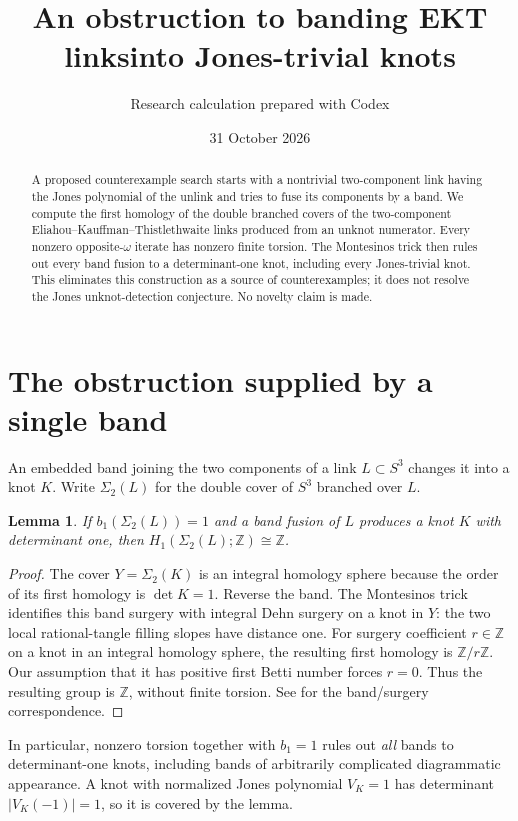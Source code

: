 \documentclass[11pt]{article}
\title{An obstruction to banding EKT links\newline into Jones-trivial knots}
\author{Research calculation prepared with Codex}
\date{31 October 2026}
\newtheorem{lemma}{Lemma}
\newcommand{\Z}{\mathbb Z}
\newcommand{\Sig}{\Sigma_2}
\begin{document}
\maketitle
\begin{abstract}
A proposed counterexample search starts with a nontrivial two-component link having the Jones polynomial of the unlink and tries to fuse its components by a band. We compute the first homology of the double branched covers of the two-component Eliahou--Kauffman--Thistlethwaite links produced from an unknot numerator. Every nonzero opposite-$\omega$ iterate has nonzero finite torsion. The Montesinos trick then rules out every band fusion to a determinant-one knot, including every Jones-trivial knot. This eliminates this construction as a source of counterexamples; it does not resolve the Jones unknot-detection conjecture. No novelty claim is made.
\end{abstract}

\section{The obstruction supplied by a single band}
An embedded band joining the two components of a link $L\subset S^3$ changes it into a knot $K$. Write $\Sig(L)$ for the double cover of $S^3$ branched over $L$.
\begin{lemma}\label{band}
If $b_1(\Sig(L))=1$ and a band fusion of $L$ produces a knot $K$ with determinant one, then $H_1(\Sig(L);\Z)\cong\Z$.
\end{lemma}
\begin{proof}
The cover $Y=\Sig(K)$ is an integral homology sphere because the order of its first homology is $\det K=1$. Reverse the band. The Montesinos trick identifies this band surgery with integral Dehn surgery on a knot in $Y$: the two local rational-tangle filling slopes have distance one. For surgery coefficient $r\in\Z$ on a knot in an integral homology sphere, the resulting first homology is $\Z/r\Z$. Our assumption that it has positive first Betti number forces $r=0$. Thus the resulting group is $\Z$, without finite torsion. See \cite{Baker} for the band/surgery correspondence.
\end{proof}
In particular, nonzero torsion together with $b_1=1$ rules out \emph{all} bands to determinant-one knots, including bands of arbitrarily complicated diagrammatic appearance. A knot with normalized Jones polynomial $V_K=1$ has determinant $|V_K(-1)|=1$, so it is covered by the lemma.
\end{document}
